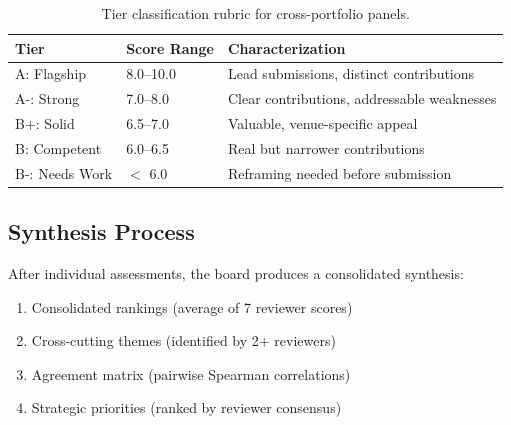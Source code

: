 \begin{table}[h]
\centering
\begin{tabular}{lll}
\toprule
Tier & Score Range & Characterization \\
\midrule
A: Flagship & 8.0--10.0 & Lead submissions, distinct contributions \\
A-: Strong & 7.0--8.0 & Clear contributions, addressable weaknesses \\
B+: Solid & 6.5--7.0 & Valuable, venue-specific appeal \\
B: Competent & 6.0--6.5 & Real but narrower contributions \\
B-: Needs Work & $<$ 6.0 & Reframing needed before submission \\
\bottomrule
\end{tabular}
\caption{Tier classification rubric for cross-portfolio panels.}
\end{table}

\subsection{Synthesis Process}

After individual assessments, the board produces a consolidated synthesis:
\begin{enumerate}
    \item Consolidated rankings (average of 7 reviewer scores)
    \item Cross-cutting themes (identified by 2+ reviewers)
    \item Agreement matrix (pairwise Spearman correlations)
    \item Strategic priorities (ranked by reviewer consensus)
\end{enumerate}
